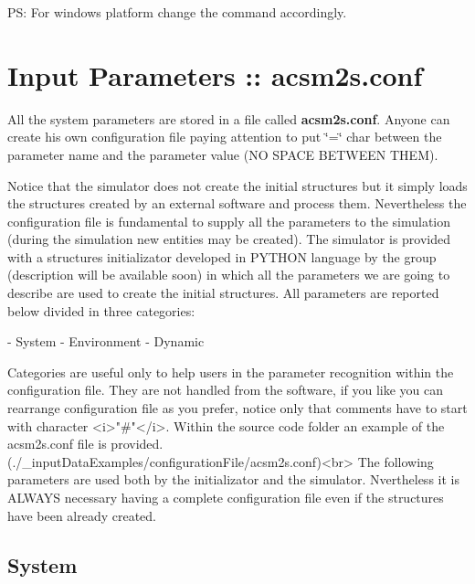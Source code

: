 P\-S\-: For windows platform change the command accordingly.

\par
\par
 \hypertarget{a00001_parameters}{}\section{Input Parameters \-:: acsm2s.\-conf}\label{a00001_parameters}


 All the system parameters are stored in a file called {\bfseries acsm2s.\-conf}. Anyone can create his own configuration file paying attention to put \char`\"{}=\char`\"{} char between the parameter name and the parameter value (N\-O S\-P\-A\-C\-E B\-E\-T\-W\-E\-E\-N T\-H\-E\-M).\par
 Notice that the simulator does not create the initial structures but it simply loads the structures created by an external software and process them. Nevertheless the configuration file is fundamental to supply all the parameters to the simulation (during the simulation new entities may be created). The simulator is provided with a structures initializator developed in P\-Y\-T\-H\-O\-N language by the group (description will be available soon) in which all the parameters we are going to describe are used to create the initial structures. All parameters are reported below divided in three categories\-: \begin{DoxyVerb}          - System
          - Environment
          - Dynamic

          Categories are useful only to help users in the parameter recognition within the configuration file. They are not handled from the software, if you like you can rearrange configuration
          file as you prefer, notice only that comments have to start with character <i>"#"</i>.
          Within the source code folder an example of the acsm2s.conf file is provided. (./_inputDataExamples/configurationFile/acsm2s.conf)<br>
 The following parameters are used both by the initializator and the simulator. Nvertheless it is ALWAYS necessary having a complete configuration file even if the structures have been already created.
\end{DoxyVerb}
 \hypertarget{a00001_paramsystem}{}\subsection{System}\label{a00001_paramsystem}

